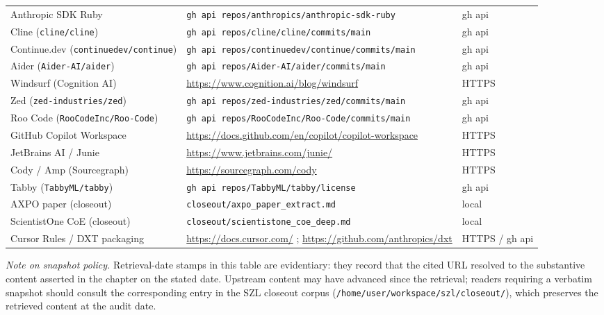 \begin{center}
\begin{tabular}{p{4.0cm}p{8.5cm}p{2.0cm}}
Anthropic SDK Ruby & \texttt{gh api repos/anthropics/anthropic-sdk-ruby} & gh api \\
Cline (\texttt{cline/cline}) & \texttt{gh api repos/cline/cline/commits/main} & gh api \\
Continue.dev (\texttt{continuedev/continue}) & \texttt{gh api repos/continuedev/continue/commits/main} & gh api \\
Aider (\texttt{Aider-AI/aider}) & \texttt{gh api repos/Aider-AI/aider/commits/main} & gh api \\
Windsurf (Cognition AI) & \url{https://www.cognition.ai/blog/windsurf} & HTTPS \\
Zed (\texttt{zed-industries/zed}) & \texttt{gh api repos/zed-industries/zed/commits/main} & gh api \\
Roo Code (\texttt{RooCodeInc/Roo-Code}) & \texttt{gh api repos/RooCodeInc/Roo-Code/commits/main} & gh api \\
GitHub Copilot Workspace & \url{https://docs.github.com/en/copilot/copilot-workspace} & HTTPS \\
JetBrains AI / Junie & \url{https://www.jetbrains.com/junie/} & HTTPS \\
Cody / Amp (Sourcegraph) & \url{https://sourcegraph.com/cody} & HTTPS \\
Tabby (\texttt{TabbyML/tabby}) & \texttt{gh api repos/TabbyML/tabby/license} & gh api \\
AXPO paper (closeout) & \texttt{closeout/axpo\_paper\_extract.md} & local \\
ScientistOne CoE (closeout) & \texttt{closeout/scientistone\_coe\_deep.md} & local \\
Cursor Rules / DXT packaging & \url{https://docs.cursor.com/} ; \url{https://github.com/anthropics/dxt} & HTTPS / gh api \\
\end{tabular}
\end{center}

\noindent\emph{Note on snapshot policy.}  Retrieval-date stamps in this
table are evidentiary: they record that the cited URL resolved to the
substantive content asserted in the chapter on the stated date.  Upstream
content may have advanced since the retrieval; readers requiring a
verbatim snapshot should consult the corresponding entry in the SZL
closeout corpus (\texttt{/home/user/workspace/szl/closeout/}), which
preserves the retrieved content at the audit date.

